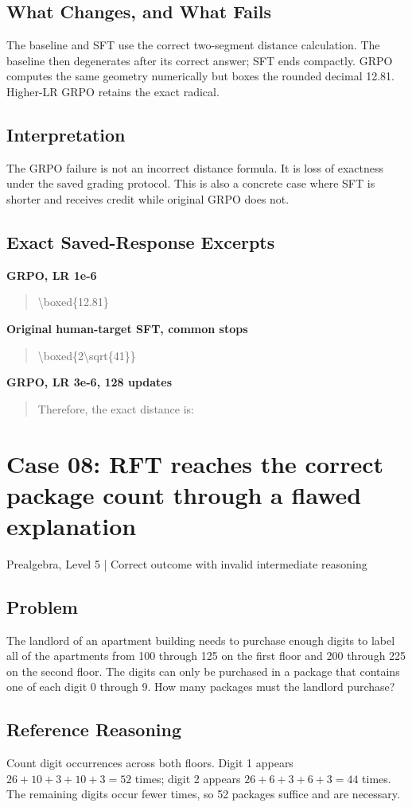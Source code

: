 \documentclass[10pt,letterpaper]{article}
\begin{document}
\subsection*{What Changes, and What Fails}
The baseline and SFT use the correct two-segment distance calculation. The baseline then degenerates after its correct answer; SFT ends compactly. GRPO computes the same geometry numerically but boxes the rounded decimal 12.81. Higher-LR GRPO retains the exact radical.
\subsection*{Interpretation}
The GRPO failure is not an incorrect distance formula. It is loss of exactness under the saved grading protocol. This is also a concrete case where SFT is shorter and receives credit while original GRPO does not.
\subsection*{Exact Saved-Response Excerpts}
\textbf{GRPO, LR 1e-6}
\begin{quote}\small\raggedright \textbackslash{}boxed\{12.81\}\end{quote}
\textbf{Original human-target SFT, common stops}
\begin{quote}\small\raggedright \textbackslash{}boxed\{2\textbackslash{}sqrt\{41\}\}\end{quote}
\textbf{GRPO, LR 3e-6, 128 updates}
\begin{quote}\small\raggedright Therefore, the exact distance is:\end{quote}
\clearpage\section*{Case 08: RFT reaches the correct package count through a flawed explanation}
Prealgebra, Level 5 | Correct outcome with invalid intermediate reasoning
\subsection*{Problem}
The landlord of an apartment building needs to purchase enough digits to label all of the apartments from 100 through 125 on the first floor and 200 through 225 on the second floor. The digits can only be purchased in a package that contains one of each digit 0 through 9. How many packages must the landlord purchase?
\subsection*{Reference Reasoning}
Count digit occurrences across both floors. Digit 1 appears $26+10+3+10+3=52$ times; digit 2 appears $26+6+3+6+3=44$ times. The remaining digits occur fewer times, so 52 packages suffice and are necessary.
\end{document}
